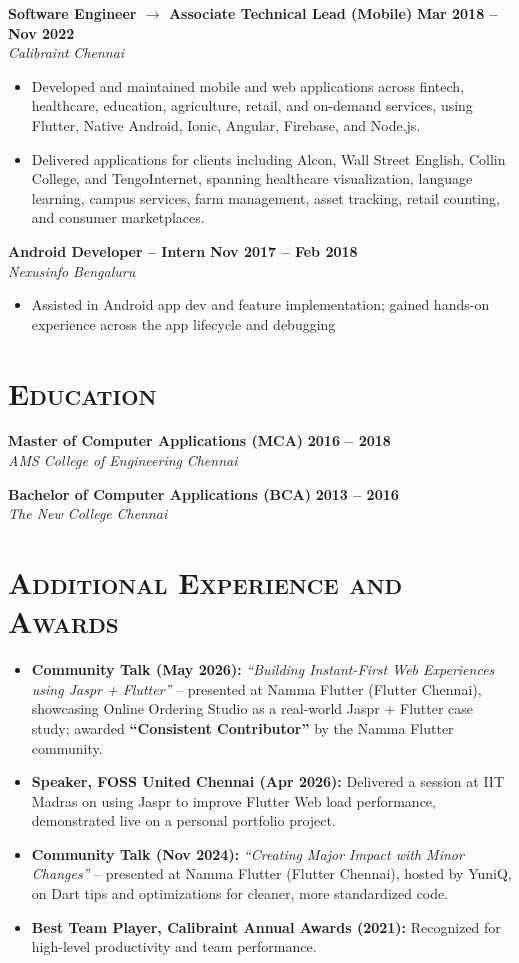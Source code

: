 \documentclass[10.5pt]{article}
\newcommand{\role}[4]{%
  \noindent\textbf{#1} \hfill \textbf{#3}\\
  {\itshape #2} \hfill {\itshape #4}\par
}
\begin{document}
\vspace{2pt}
\role{Software Engineer $\rightarrow$ Associate Technical Lead (Mobile)}{Calibraint}{Mar 2018 -- Nov 2022}{Chennai}
\begin{itemize}
\item Developed and maintained mobile and web applications across fintech, healthcare, education, agriculture, retail, and on-demand services, using Flutter, Native Android, Ionic, Angular, Firebase, and Node.js.
\item Delivered applications for clients including Alcon, Wall Street English, Collin College, and TengoInternet, spanning healthcare visualization, language learning, campus services, farm management, asset tracking, retail counting, and consumer marketplaces.
\end{itemize}

\vspace{2pt}
\role{Android Developer -- Intern}{Nexusinfo}{Nov 2017 -- Feb 2018}{Bengaluru}
\begin{itemize}
\item Assisted in Android app dev and feature implementation; gained hands-on experience across the app lifecycle and debugging
\end{itemize}

\section*{\scshape Education}

\role{Master of Computer Applications (MCA)}{AMS College of Engineering}{2016 -- 2018}{Chennai}
\role{Bachelor of Computer Applications (BCA)}{The New College}{2013 -- 2016}{Chennai}

\section*{\scshape Additional Experience and Awards}
\vspace{8pt}
\begin{itemize}
\item \textbf{Community Talk (May 2026):} \textit{``Building Instant-First Web Experiences using Jaspr + Flutter''} -- presented at Namma Flutter (Flutter Chennai), showcasing Online Ordering Studio as a real-world Jaspr + Flutter case study; awarded \textbf{``Consistent Contributor''} by the Namma Flutter community.
\item \textbf{Speaker, FOSS United Chennai (Apr 2026):} Delivered a session at IIT Madras on using Jaspr to improve Flutter Web load performance, demonstrated live on a personal portfolio project.
\item \textbf{Community Talk (Nov 2024):} \textit{``Creating Major Impact with Minor Changes''} -- presented at Namma Flutter (Flutter Chennai), hosted by YuniQ, on Dart tips and optimizations for cleaner, more standardized code.
\item \textbf{Best Team Player, Calibraint Annual Awards (2021):} Recognized for high-level productivity and team performance.
\end{itemize}
\end{document}
